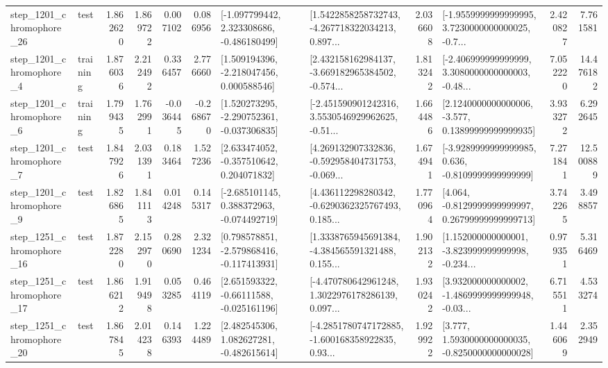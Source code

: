 \begin{tabular}{llrrrrllrlrr}
 step\_1201\_chromophore\_26 &      test &      1.862620 &    1.869722 &      0.007102 &  0.086956 &   [-1.097799442, 2.323308686, -0.486180499] &  [1.5422858258732743, -4.267718322034213, 0.897... &       2.036608 &  [-1.9559999999999995, 3.7230000000000025, -0.7... &            2.420827 &          7.761581 \\
  step\_1201\_chromophore\_4 &  training &      1.876036 &    2.212492 &      0.336457 &  2.776660 &    [1.509194396, -2.218047456, 0.000588546] &  [2.432158162984137, -3.669182965384502, -0.574... &       1.813242 &  [-2.406999999999999, 3.3080000000000003, -0.48... &            7.052220 &         14.476182 \\
  step\_1201\_chromophore\_6 &  training &      1.799435 &    1.762991 &     -0.036445 & -0.268670 &   [1.520273295, -2.290752361, -0.037306835] &  [-2.451590901242316, 3.5530546929962625, -0.51... &       1.664486 &  [2.1240000000000006, -3.577, 0.13899999999999935] &            3.933272 &          6.292645 \\
  step\_1201\_chromophore\_7 &      test &      1.847926 &    2.031391 &      0.183464 &  1.527236 &    [2.633474052, -0.357510642, 0.204071832] &  [4.269132907332836, -0.592958404731753, -0.069... &       1.674941 &  [-3.9289999999999985, 0.636, -0.8109999999999999] &            7.271841 &         12.500889 \\
  step\_1201\_chromophore\_9 &      test &      1.826865 &    1.841113 &      0.014248 &  0.145317 &   [-2.685101145, 0.388372963, -0.074492719] &  [4.436112298280342, -0.6290362325767493, 0.185... &       1.770964 &  [4.064, -0.8129999999999997, 0.26799999999999713] &            3.742265 &          3.498857 \\
 step\_1251\_chromophore\_16 &      test &      1.872280 &    2.152970 &      0.280690 &  2.321234 &   [0.798578851, -2.579868416, -0.117413931] &  [1.3338765945691384, -4.384565591321488, 0.155... &       1.902132 &  [1.152000000000001, -3.823999999999998, -0.234... &            0.979351 &          5.316469 \\
 step\_1251\_chromophore\_17 &      test &      1.866212 &    1.919498 &      0.053285 &  0.464119 &    [2.651593322, -0.66111588, -0.025161196] &  [-4.470780642961248, 1.3022976178286139, 0.097... &       1.930242 &  [3.932000000000002, -1.4869999999999948, -0.03... &            6.715511 &          4.533274 \\
 step\_1251\_chromophore\_20 &      test &      1.867845 &    2.014238 &      0.146393 &  1.224489 &    [2.482545306, 1.082627281, -0.482615614] &  [-4.2851780747172885, -1.600168358922835, 0.93... &       1.929922 &   [3.777, 1.5930000000000035, -0.8250000000000028] &            1.446069 &          2.352949 \\

\end{tabular}
